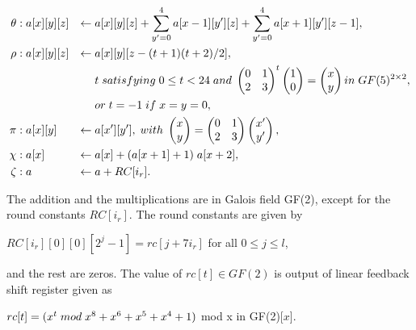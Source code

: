 \documentclass[12pt]{artikel3}                  %
\begin{document}
\begin{align*}
\theta &: a[x][y][z] & \gets & \thickspace a[x][y][z] + \displaystyle\sum\limits_{y' = 0}^{4} a[x - 1][y'][z] + \displaystyle\sum\limits_{y' = 0}^{4} a[x + 1][y'][z - 1], \\
\rho &: a[x][y][z] & \gets & \thickspace a[x][y][z - (t + 1)(t + 2) / 2], \\
& & & \thickspace t \thickspace satisfying \thickspace 0 \leq t < 24 \thickspace and \thickspace
\begin{pmatrix} 0 & 1 \\ 2 & 3 \end{pmatrix}^{t} \begin{pmatrix} 1 \\ 0 \end{pmatrix} = \begin{pmatrix} x \\ y \end{pmatrix}
in \thickspace GF(5)^{2 \times 2}, \\
& & & \thickspace or \thickspace t = -1 \thickspace if \thickspace x = y = 0, \\
\pi &: a[x][y] & \gets & \thickspace a[x'][y'], \thickspace with \thickspace
\begin{pmatrix} x \\ y \end{pmatrix} = \begin{pmatrix} 0 & 1 \\ 2 & 3 \end{pmatrix} \begin{pmatrix} x' \\ y'\end{pmatrix}, \\
\chi &: a[x] & \gets & \thickspace a[x] + (a[x + 1] + 1) \thickspace a[x + 2], \\
\zeta &: a & \gets & \thickspace a + RC[i_{r}].
\end{align*}

The addition and the multiplications are in Galois field GF(2), except for the round constants $RC[i_{r}]$. The round constants 
are given by

\begin{center} $RC[i_{r}][0][0][2^{j} - 1] = rc[j + 7i_{r}]$ for all $ 0 \leq j \leq l$, \end{center}

and the rest are zeros. The value of $rc[t] \in GF(2)$ is output of linear feedback shift register given as 

\begin{center}$rc[t] = (x^{t} \thickspace mod \thickspace x^{8} + x^{6} + x^{5} + x^{4} + 1)$ mod x in GF(2)[$x$].\end{center}
\end{document}
